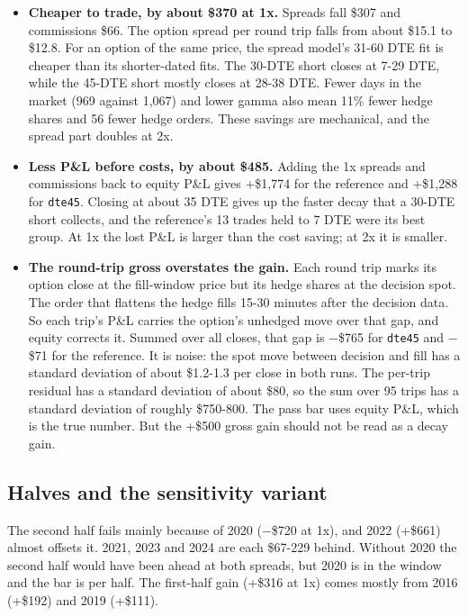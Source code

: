 \documentclass{article}
\begin{document}
\begin{itemize}

\item \textbf{Cheaper to trade, by about \$370 at 1x.} Spreads fall \$307 and commissions \$66. The option spread per round trip falls from about \$15.1 to \$12.8. For an option of the same price, the spread model's 31-60 DTE fit is cheaper than its shorter-dated fits. The 30-DTE short closes at 7-29 DTE, while the 45-DTE short mostly closes at 28-38 DTE. Fewer days in the market (969 against 1,067) and lower gamma also mean 11\% fewer hedge shares and 56 fewer hedge orders. These savings are mechanical, and the spread part doubles at 2x.

\item \textbf{Less P\&L before costs, by about \$485.} Adding the 1x spreads and commissions back to equity P\&L gives +\$1,774 for the reference and +\$1,288 for \texttt{dte45}. Closing at about 35 DTE gives up the faster decay that a 30-DTE short collects, and the reference's 13 trades held to 7 DTE were its best group. At 1x the lost P\&L is larger than the cost saving; at 2x it is smaller.

\item \textbf{The round-trip gross overstates the gain.} Each round trip marks its option close at the fill-window price but its hedge shares at the decision spot. The order that flattens the hedge fills 15-30 minutes after the decision data. So each trip's P\&L carries the option's unhedged move over that gap, and equity corrects it. Summed over all closes, that gap is \ensuremath{-}\$765 for \texttt{dte45} and \ensuremath{-}\$71 for the reference. It is noise: the spot move between decision and fill has a standard deviation of about \$1.2-1.3 per close in both runs. The per-trip residual has a standard deviation of about \$80, so the sum over 95 trips has a standard deviation of roughly \$750-800. The pass bar uses equity P\&L, which is the true number. But the +\$500 gross gain should not be read as a decay gain.

\end{itemize}

\subsection{Halves and the sensitivity variant}

The second half fails mainly because of 2020 (\ensuremath{-}\$720 at 1x), and 2022 (+\$661) almost offsets it. 2021, 2023 and 2024 are each \$67-229 behind. Without 2020 the second half would have been ahead at both spreads, but 2020 is in the window and the bar is per half. The first-half gain (+\$316 at 1x) comes mostly from 2016 (+\$192) and 2019 (+\$111).
\end{document}
